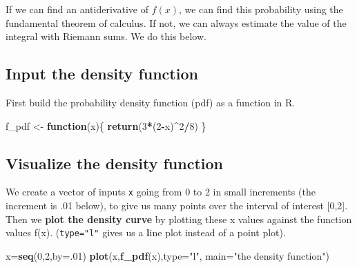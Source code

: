\documentclass[
]{book}
\newenvironment{Shaded}{\begin{snugshade}}{\end{snugshade}}
\newcommand{\AttributeTok}[1]{\textcolor[rgb]{0.13,0.29,0.53}{#1}}
\newcommand{\ControlFlowTok}[1]{\textcolor[rgb]{0.13,0.29,0.53}{\textbf{#1}}}
\newcommand{\DecValTok}[1]{\textcolor[rgb]{0.00,0.00,0.81}{#1}}
\newcommand{\FunctionTok}[1]{\textcolor[rgb]{0.13,0.29,0.53}{\textbf{#1}}}
\newcommand{\NormalTok}[1]{#1}
\newcommand{\OtherTok}[1]{\textcolor[rgb]{0.56,0.35,0.01}{#1}}
\newcommand{\SpecialCharTok}[1]{\textcolor[rgb]{0.81,0.36,0.00}{\textbf{#1}}}
\newcommand{\StringTok}[1]{\textcolor[rgb]{0.31,0.60,0.02}{#1}}
\theoremstyle{definition}
\theoremstyle{definition}
\theoremstyle{definition}
\theoremstyle{definition}
\theoremstyle{remark}
\begin{document}
If we can find an antiderivative of \(f(x)\), we can find this probability using the fundamental theorem of calculus. If not, we can always estimate the value of the integral with Riemann sums. We do this below.

\subsection{Input the density function}\label{input-the-density-function}

First build the probability density function (pdf) as a function in R.

\begin{Shaded}
\begin{Highlighting}[]
\NormalTok{f\_pdf }\OtherTok{\textless{}{-}} \ControlFlowTok{function}\NormalTok{(x)\{}
  \FunctionTok{return}\NormalTok{(}\DecValTok{3}\SpecialCharTok{*}\NormalTok{(}\DecValTok{2}\SpecialCharTok{{-}}\NormalTok{x)}\SpecialCharTok{\^{}}\DecValTok{2}\SpecialCharTok{/}\DecValTok{8}\NormalTok{)}
\NormalTok{\}}
\end{Highlighting}
\end{Shaded}

\subsection{Visualize the density function}\label{visualize-the-density-function}

We create a vector of inputs \texttt{x} going from 0 to 2 in small increments (the increment is .01 below), to give us many points over the interval of interest {[}0,2{]}. Then we \textbf{plot the density curve} by plotting these x values against the function values f(x). (\texttt{type="l"} gives us a \textbf{l}ine plot instead of a point plot).

\begin{Shaded}
\begin{Highlighting}[]
\NormalTok{x}\OtherTok{=}\FunctionTok{seq}\NormalTok{(}\DecValTok{0}\NormalTok{,}\DecValTok{2}\NormalTok{,}\AttributeTok{by=}\NormalTok{.}\DecValTok{01}\NormalTok{)}
\FunctionTok{plot}\NormalTok{(x,}\FunctionTok{f\_pdf}\NormalTok{(x),}\AttributeTok{type=}\StringTok{"l"}\NormalTok{,}
     \AttributeTok{main=}\StringTok{"the density function"}\NormalTok{)}
\end{Highlighting}
\end{Shaded}
\end{document}
